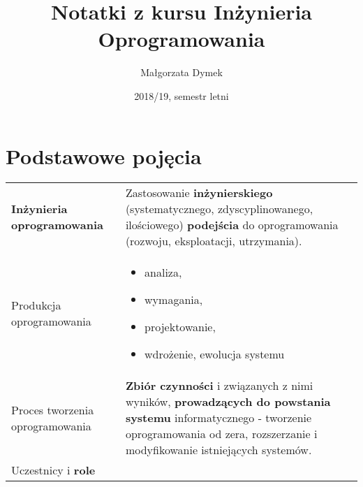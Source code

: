 \documentclass[a4paper]{article}
\title{Notatki z kursu Inżynieria Oprogramowania}
\author{Małgorzata Dymek}
\date{2018/19, semestr letni}
\begin{document}
    \maketitle


    \section{Podstawowe pojęcia}


    \begin{table}[H]
        \begin{center}
            \begin{tabular}{  p{8cm} p{8cm}  }
                \textbf{Inżynieria oprogramowania}
                &
                Zastosowanie \textbf{inżynierskiego} (systematycznego, zdyscyplinowanego, ilościowego) \textbf{podejścia}
                do oprogramowania (rozwoju, eksploatacji, utrzymania).
                \\
                \cmidrule(r){1-1}\cmidrule(l){2-2}
                Produkcja oprogramowania
                &
                \begin{itemize}
                    \item analiza,
                    \item wymagania,
                    \item projektowanie,
                    \item wdrożenie, ewolucja systemu
                \end{itemize}
                \\
                \cmidrule(r){1-1}\cmidrule(l){2-2}
                Proces tworzenia oprogramowania
                &
                \textbf{Zbiór czynności} i związanych z nimi wyników, \textbf{prowadzących do powstania
                systemu} informatycznego - tworzenie oprogramowania od zera, rozszerzanie i modyfikowanie istniejących systemów.
                \\
                \cmidrule(r){1-1}\cmidrule(l){2-2}
                Uczestnicy i \textbf{role} & \\


\end{tabular}
\end{center}
\end{table}
\end{document}
